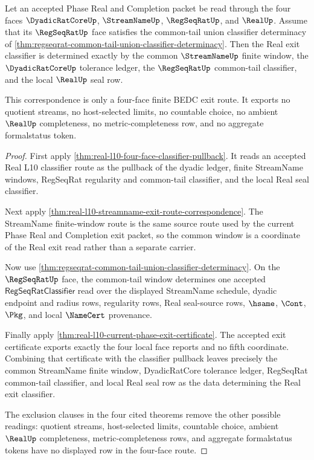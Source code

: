 \begin{theorem}
\label{thm:real-l10-common-tail-exit-correspondence}
Let an accepted Phase Real and Completion packet be read through the four
faces $\DyadicRatCoreUp$, $\StreamNameUp$, $\RegSeqRatUp$, and $\RealUp$.
Assume that its $\RegSeqRatUp$ face satisfies the common-tail union classifier
determinacy of
\autoref{thm:regseqrat-common-tail-union-classifier-determinacy}. Then the
Real exit classifier is determined exactly by the common $\StreamNameUp$
finite window, the $\DyadicRatCoreUp$ tolerance ledger, the $\RegSeqRatUp$
common-tail classifier, and the local $\RealUp$ seal row.

This correspondence is only a four-face finite BEDC exit route. It exports no
quotient streams, no host-selected limits, no countable choice, no ambient
$\RealUp$ completeness, no metric-completeness row, and no aggregate
formalstatus token.
\end{theorem}
\begin{proof}
First apply \autoref{thm:real-l10-four-face-classifier-pullback}. It reads an
accepted Real L10 classifier route as the pullback of the dyadic ledger,
finite StreamName windows, RegSeqRat regularity and common-tail classifier,
and the local Real seal classifier.

Next apply \autoref{thm:real-l10-streamname-exit-route-correspondence}. The
StreamName finite-window route is the same source route used by the current
Phase Real and Completion exit packet, so the common window is a coordinate
of the Real exit read rather than a separate carrier.

Now use
\autoref{thm:regseqrat-common-tail-union-classifier-determinacy}. On the
$\RegSeqRatUp$ face, the common-tail window determines one accepted
$\mathsf{RegSeqRatClassifier}$ read over the displayed StreamName schedule,
dyadic endpoint and radius rows, regularity rows, Real seal-source rows,
$\hsame$, $\Cont$, $\Pkg$, and local $\NameCert$ provenance.

Finally apply \autoref{thm:real-l10-current-phase-exit-certificate}. The
accepted exit certificate exports exactly the four local face reports and no
fifth coordinate. Combining that certificate with the classifier pullback
leaves precisely the common StreamName finite window, DyadicRatCore
tolerance ledger, RegSeqRat common-tail classifier, and local Real seal row
as the data determining the Real exit classifier.

The exclusion clauses in the four cited theorems remove the other possible
readings: quotient streams, host-selected limits, countable choice, ambient
$\RealUp$ completeness, metric-completeness rows, and aggregate formalstatus
tokens have no displayed row in the four-face route.
\end{proof}


